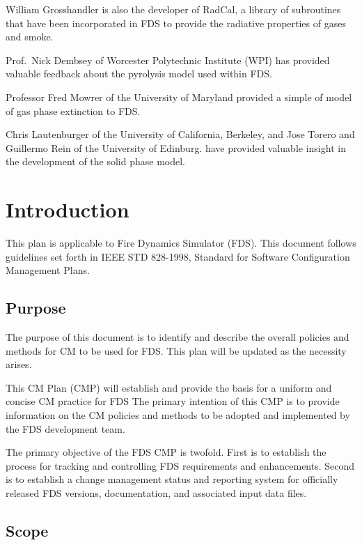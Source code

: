 \documentclass[11pt]{book}
\begin{document}
William Grosshandler is also the developer of RadCal, a library of
subroutines that have been incorporated in FDS to provide the
radiative properties of gases and smoke.

Prof.~Nick Dembsey of Worcester Polytechnic Institute (WPI) has provided valuable feedback about the pyrolysis model used within FDS.

Professor Fred Mowrer of the University of Maryland provided a simple
of model of gas phase extinction to FDS.

Chris Lautenburger of the University of California, Berkeley, and Jose Torero and Guillermo Rein of the University of Edinburg. have
provided valuable insight in the development of the solid phase model.








\tableofcontents

\mainmatter

\chapter{Introduction}

This plan is applicable to Fire Dynamics Simulator (FDS).  This document follows guidelines set forth in IEEE 
STD 828-1998, Standard for Software Configuration Management Plans.

\section{Purpose}

The purpose of this document is to identify and describe the overall policies and methods for CM to be used for
FDS.  This plan will be updated as the necessity arises. 

This CM Plan (CMP) will establish and provide the basis for a uniform and concise CM practice for FDS
The primary intention of this CMP is to provide information on the CM policies and methods to be adopted and
implemented by the FDS development team.

The primary objective of the FDS CMP is twofold.  First is to establish the process for tracking and controlling
FDS requirements and enhancements.  Second is to establish a change management status and reporting system for
officially released FDS versions, documentation, and associated input data files.

\section{Scope}
\end{document}
